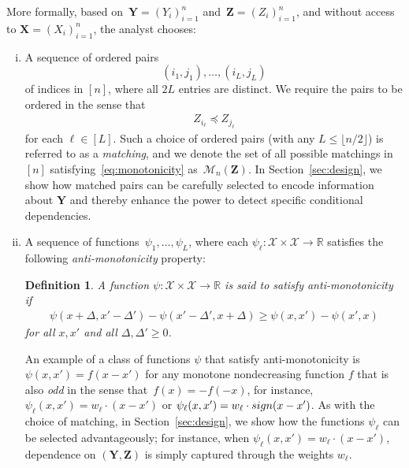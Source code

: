 \documentclass[12pt]{article}
\newtheorem{definition}{Definition}
\newcommand{\R}{\mathbb{R}}
\newcommand{\Xcal}{\mathcal{X}}
\newcommand{\bX}{\mathbf{X}}
\newcommand{\bY}{\mathbf{Y}}
\newcommand{\bZ}{\mathbf{Z}}
\begin{document}
More formally, based on~$\bY = (Y_i)_{i=1}^n$ and~$\bZ = (Z_i)_{i=1}^n$, and without access to $\bX = (X_i)_{i=1}^n$, the analyst chooses:
\begin{enumerate}[(i)]
    \item A sequence of ordered pairs 
    \[
    (i_{1},j_{1}),\ldots, (i_{L},j_{L})
    \]
    of indices in $[n]$, where all $2L$ entries are distinct.
    We require the pairs to be ordered in the sense that 
    \begin{align}\label{eq:monotonicity}
        Z_{i_\ell}\preceq Z_{j_\ell}
    \end{align}
    for each $\ell \in [L]$.  Such a choice of ordered pairs (with any $L \leq \lfloor n/2 \rfloor$) is referred to as a \emph{matching}, and we denote the set of all possible matchings in $[n]$ satisfying~\eqref{eq:monotonicity} as~$\mathcal{M}_n(\bZ)$. In Section~\ref{sec:design}, we show how matched pairs can be carefully selected to encode information about $\bY$ and thereby enhance the power to detect specific conditional dependencies.
    
    \item A sequence of functions~$\psi_1,\ldots,\psi_L$, where each $\psi_\ell : \Xcal\times \Xcal \to \R$ satisfies the following \emph{anti-monotonicity} property:
    \begin{definition}
    A function $\psi:\Xcal\times\Xcal\to\R$ is said to satisfy anti-monotonicity if 
        \begin{align}
        \label{defn:monotonicity-of-psi}
        \psi(x + \Delta, x' - \Delta') - \psi(x' - \Delta', x + \Delta) \geq \psi(x,x') - \psi(x',x) 
    \end{align}
    for all $x,x'$ and all $\Delta,\Delta'\geq 0$.
    \end{definition}
     An example of a class of functions $\psi$ that satisfy anti-monotonicity is $\psi(x,x')=f(x-x')$ for any monotone nondecreasing function $f$ that is also \emph{odd} in the sense that~$f(x)= -f(-x)$, for instance, $\psi_\ell(x,x') = w_\ell\cdot (x-x')$ or $\psi_\ell(x,x') = w_\ell\cdot \textnormal{sign}(x-x')$.  As with the choice of matching, in Section~\ref{sec:design}, we show how the functions ${\psi_\ell}$ can be selected advantageously; for instance, when $\psi_\ell(x,x') = w_\ell\cdot (x-x')$, dependence on $(\bY,\bZ)$ is simply captured through the weights $w_\ell$.
\end{enumerate}
\end{document}
